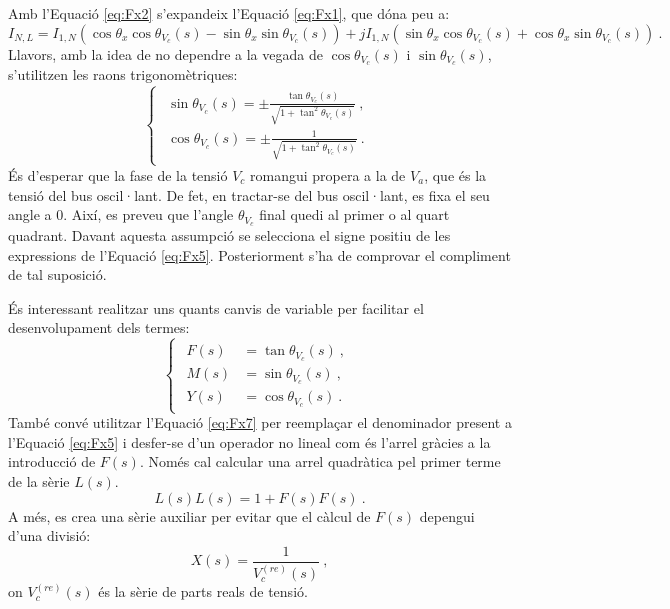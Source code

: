 Amb l'Equació \ref{eq:Fx2} s'expandeix l'Equació \ref{eq:Fx1}, que dóna peu a:
\begin{equation}
    I_{N,L}=I_{1,N}(\cos\theta_x\cos\theta_{V_c}(s)-\sin\theta_x\sin\theta_{V_c}(s))+jI_{1,N}(\sin\theta_x\cos\theta_{V_c}(s)+\cos\theta_x\sin\theta_{V_c}(s))\ .
    \label{eq:Fx4}
\end{equation}
Llavors, amb la idea de no dependre a la vegada de $\cos\theta_{V_c}(s)$ i $\sin\theta_{V_c}(s)$, s'utilitzen les raons trigonomètriques:
\begin{equation}
    \begin{cases}
    \begin{split}
    \sin\theta_{V_c}(s)=\pm \frac{\tan\theta_{V_c}(s)}{\sqrt{1+\tan^2\theta_{V_c}(s)}}\ ,
    \\
    \cos\theta_{V_c}(s)=\pm \frac{1}{\sqrt{1+\tan^2\theta_{V_c}(s)}}\ .
    \end{split}
\end{cases}
    \label{eq:Fx5}
\end{equation}
És d'esperar que la fase de la tensió $V_c$ romangui propera a la de $V_a$, que és la tensió del bus oscil·lant. De fet, en tractar-se del bus oscil·lant, es fixa el seu angle a 0. Així, es preveu que l'angle $\theta_{V_c}$ final quedi al primer o al quart quadrant. Davant aquesta assumpció se selecciona el signe positiu de les expressions de l'Equació \ref{eq:Fx5}. Posteriorment s'ha de comprovar el compliment de tal suposició.

És interessant realitzar uns quants canvis de variable per facilitar el desenvolupament dels termes:
\begin{equation}
    \begin{cases}
\begin{split}
F(s)&=\tan\theta_{V_c}(s)\ ,
\\
M(s)&=\sin\theta_{V_c}(s)\ ,
\\
Y(s)&=\cos\theta_{V_c}(s)\ .
\end{split}
\end{cases}
\label{eq:Fx6}
\end{equation}
També convé utilitzar l'Equació \ref{eq:Fx7} per reemplaçar el denominador present a l'Equació \ref{eq:Fx5} i desfer-se d'un operador no lineal com és l'arrel gràcies a la introducció de $F(s)$. Només cal calcular una arrel quadràtica pel primer terme de la sèrie $L(s)$.
\begin{equation}
L(s)L(s)=1+F(s)F(s)\ .
\label{eq:Fx7}
\end{equation}
A més, es crea una sèrie auxiliar per evitar que el càlcul de $F(s)$ depengui d'una divisió:
\begin{equation}
X(s)=\frac{1}{V_c^{(re)}(s)}\ ,
\label{eq:Fx8}
\end{equation}
on $V_c^{(re)}(s)$ és la sèrie de parts reals de tensió.

